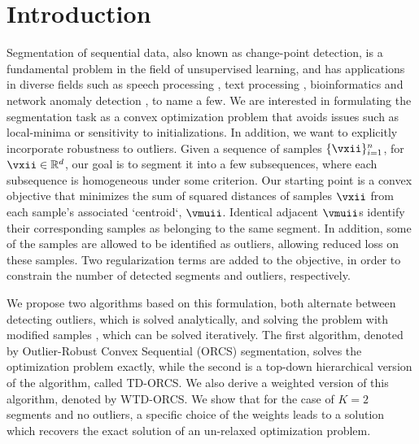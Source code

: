 \section{Introduction}\label{sec:intro}
Segmentation of sequential data, also known as change-point detection, is a fundamental problem in the field
of unsupervised learning, and has applications in diverse fields such
as speech processing \cite{brent1999speech,phonemeSeg:2008,Shriberg2000127},
text processing \cite{beeferman1999statistical}, bioinformatics \cite{olshen2004circular}
and network anomaly detection \cite{levy2009detection}, to name a few.
We are interested in formulating the segmentation task as a convex optimization
problem that avoids issues such as local-minima or sensitivity to
initializations. In addition, we want to explicitly incorporate robustness to outliers.
Given a sequence of samples $\{\vxii\}_{i=1}^n$, for
$\vxii\in\mathbb{R}^d$, our goal is to segment it into a few
subsequences, where each subsequence is homogeneous under some criterion. Our starting point is a convex objective
that minimizes the sum of squared distances of samples $\vxii$ from each sample's associated `centroid`, $\vmuii$. Identical adjacent $\vmuii$s identify their corresponding samples as belonging to the same segment.
In addition, some of the samples are allowed to be identified as outliers, allowing reduced loss on these samples. Two regularization terms are added to the objective, in order to constrain the number of detected segments and outliers, respectively. %

We propose two algorithms
based on this formulation, both alternate between detecting outliers, which is solved analytically, and solving the problem
with modified samples %
, which can be solved iteratively.
The first algorithm, denoted by Outlier-Robust Convex Sequential (ORCS)
segmentation, solves the optimization problem exactly, while the
second is a top-down hierarchical version of the algorithm, called
TD-ORCS. We also derive a weighted version of this algorithm, denoted by WTD-ORCS. We show that for the case of $K=2$ segments and no outliers, a specific choice of the weights leads to a solution which recovers the exact solution of an un-relaxed optimization problem.


